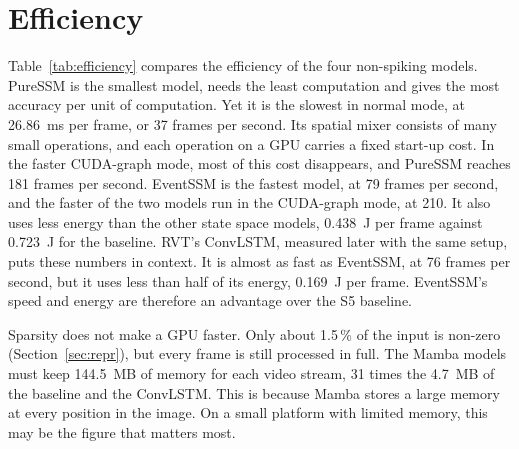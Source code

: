 \documentclass[11pt, a4paper]{report}
\begin{document}
\section{Efficiency}
\label{sec:efficiency}
Table~\ref{tab:efficiency} compares the efficiency of the four non-spiking models.
PureSSM is the smallest model, needs the least computation and gives the most accuracy per unit of
computation. Yet it is the slowest in normal mode, at 26.86~ms per frame, or 37 frames per second. Its
spatial mixer consists of many small operations, and each operation on a GPU carries a fixed
start-up cost. In the faster CUDA-graph mode, most of this cost disappears, and PureSSM reaches 181 frames per
second. EventSSM is the fastest model, at 79 frames per second, and the faster of the two models run in the CUDA-graph mode, at 210. It also uses less
energy than the other state space models, 0.438~J per frame against 0.723~J for the baseline. RVT's
ConvLSTM, measured later with the same setup, puts these numbers in context. It is almost as fast as
EventSSM, at 76 frames per second, but it uses less than half of its energy, 0.169~J per frame. EventSSM's
speed and energy are therefore an advantage over the S5 baseline.

Sparsity does not make a GPU faster. Only
about 1.5\,\% of the input is non-zero (Section~\ref{sec:repr}), but every frame is still processed in
full. The Mamba models must keep 144.5~MB of memory for each video stream, 31 times the 4.7~MB of the
baseline and the ConvLSTM. This is because Mamba stores a large memory at every position in the image. On a small
platform with limited memory, this may be the figure that matters most.
\end{document}

